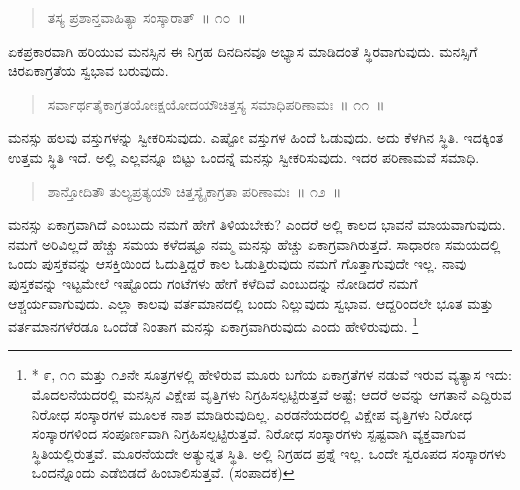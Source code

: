 \vspace{-0.3cm}

\begin{verse}
ತಸ್ಯ ಪ್ರಶಾನ್ತವಾಹಿತ್ಯಾ ಸಂಸ್ಕಾರಾತ್​~॥ ೧೦~॥
\end{verse}

\vspace{-0.3cm}


\vskip 0.2cm

ಏಕಪ್ರಕಾರವಾಗಿ ಹರಿಯುವ ಮನಸ್ಸಿನ ಈ ನಿಗ್ರಹ ದಿನದಿನವೂ ಅಭ್ಯಾಸ ಮಾಡಿದಂತೆ ಸ್ಥಿರವಾಗುವುದು. ಮನಸ್ಸಿಗೆ ಚಿರಏಕಾಗ್ರತೆಯ ಸ್ವಭಾವ ಬರುವುದು. 

\vspace{-0.3cm}


\begin{verse}
ಸರ್ವಾರ್ಥತೈಕಾಗ್ರತಯೋಃಕ್ಷಯೋದಯೌಚಿತ್ತಸ್ಯ ಸಮಾಧಿಪರಿಣಾಮಃ~॥ ೧೧~॥
\end{verse}

\vspace{-0.3cm}


\vskip 0.2cm

ಮನಸ್ಸು ಹಲವು ವಸ್ತುಗಳನ್ನು ಸ್ವೀಕರಿಸುವುದು. ಎಷ್ಟೋ ವಸ್ತುಗಳ ಹಿಂದೆ ಓಡುವುದು. ಅದು ಕೆಳಗಿನ ಸ್ಥಿತಿ. ಇದಕ್ಕಿಂತ ಉತ್ತಮ ಸ್ಥಿತಿ ಇದೆ. ಅಲ್ಲಿ ಎಲ್ಲವನ್ನೂ ಬಿಟ್ಟು ಒಂದನ್ನೆ ಮನಸ್ಸು ಸ್ವೀಕರಿಸುವುದು. ಇದರ ಪರಿಣಾಮವೆ ಸಮಾಧಿ. 

\vspace{-0.3cm}

\begin{verse}
ಶಾನ್ತೋದಿತೌ ತುಲ್ಯಪ್ರತ್ಯಯೌ ಚಿತ್ತಸ್ಯೈಕಾಗ್ರತಾ ಪರಿಣಾಮಃ~॥ ೧೨~॥
\end{verse}

\vspace{-0.3cm}


\vskip 0.2cm

ಮನಸ್ಸು ಏಕಾಗ್ರವಾಗಿದೆ ಎಂಬುದು ನಮಗೆ ಹೇಗೆ ತಿಳಿಯಬೇಕು? ಎಂದರೆ ಅಲ್ಲಿ ಕಾಲದ ಭಾವನೆ ಮಾಯವಾಗುವುದು. ನಮಗೆ ಅರಿವಿಲ್ಲದೆ ಹೆಚ್ಚು ಸಮಯ ಕಳೆದಷ್ಟೂ ನಮ್ಮ ಮನಸ್ಸು ಹೆಚ್ಚು ಏಕಾಗ್ರವಾಗಿರುತ್ತದೆ. ಸಾಧಾರಣ ಸಮಯದಲ್ಲಿ ಒಂದು ಪುಸ್ತಕವನ್ನು ಆಸಕ್ತಿಯಿಂದ ಓದುತ್ತಿದ್ದರೆ ಕಾಲ ಓಡುತ್ತಿರುವುದು ನಮಗೆ ಗೊತ್ತಾಗುವುದೇ ಇಲ್ಲ. ನಾವು ಪುಸ್ತಕವನ್ನು ಇಟ್ಟಮೇಲೆ ಇಷ್ಟೊಂದು ಗಂಟೆಗಳು ಹೇಗೆ ಕಳೆದಿವೆ ಎಂಬುದನ್ನು ನೋಡಿದರೆ ನಮಗೆ ಆಶ್ಚರ್ಯವಾಗುವುದು. ಎಲ್ಲಾ ಕಾಲವು ವರ್ತಮಾನದಲ್ಲಿ ಬಂದು ನಿಲ್ಲುವುದು ಸ್ವಭಾವ. ಆದ್ದರಿಂದಲೇ ಭೂತ ಮತ್ತು ವರ್ತಮಾನಗಳೆರಡೂ ಒಂದೆಡೆ ನಿಂತಾಗ ಮನಸ್ಸು ಏಕಾಗ್ರವಾಗಿರುವುದು ಎಂದು ಹೇಳಿರುವುದು. \footnote{* ೯, ೧೧ ಮತ್ತು ೧೨ನೇ ಸೂತ್ರಗಳಲ್ಲಿ ಹೇಳಿರುವ ಮೂರು ಬಗೆಯ ಏಕಾಗ್ರತೆಗಳ ನಡುವೆ ಇರುವ ವ್ಯತ್ಯಾಸ ಇದು: ಮೊದಲನೆಯದರಲ್ಲಿ ಮನಸ್ಸಿನ ವಿಕ್ಷೇಪ ವೃತ್ತಿಗಳು ನಿಗ್ರಹಿಸಲ್ಪಟ್ಟಿರುತ್ತವೆ ಅಷ್ಟೆ; ಆದರೆ ಅವನ್ನು ಆಗತಾನೆ ಎದ್ದಿರುವ ನಿರೋಧ ಸಂಸ್ಕಾರಗಳ ಮೂಲಕ ನಾಶ ಮಾಡಿರುವುದಿಲ್ಲ. ಎರಡನೆಯದರಲ್ಲಿ ವಿಕ್ಷೇಪ ವೃತ್ತಿಗಳು ನಿರೋಧ ಸಂಸ್ಕಾರಗಳಿಂದ ಸಂಪೂರ್ಣವಾಗಿ ನಿಗ್ರಹಿಸಲ್ಪಟ್ಟಿರುತ್ತವೆ. ನಿರೋಧ ಸಂಸ್ಕಾರಗಳು ಸ್ಪಷ್ಟವಾಗಿ ವ್ಯಕ್ತವಾಗುವ ಸ್ಥಿತಿಯಲ್ಲಿರುತ್ತವೆ. ಮೂರನೆಯದೇ ಅತ್ಯುನ್ನತ ಸ್ಥಿತಿ. ಅಲ್ಲಿ ನಿಗ್ರಹದ ಪ್ರಶ್ನೆ ಇಲ್ಲ. ಒಂದೇ ಸ್ವರೂಪದ ಸಂಸ್ಕಾರಗಳು ಒಂದನ್ನೊಂದು ಎಡೆಬಿಡದೆ ಹಿಂಬಾಲಿಸುತ್ತವೆ. (ಸಂಪಾದಕ)}



